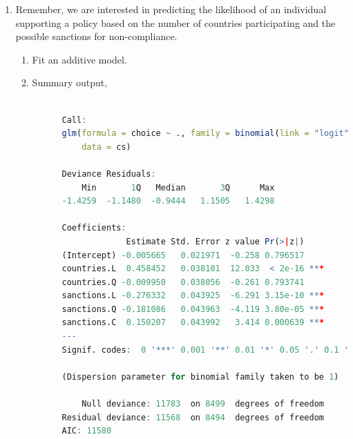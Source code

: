 \documentclass[12pt,letterpaper]{article}
\begin{document}
\begin{enumerate}
	\item
	Remember, we are interested in predicting the likelihood of an individual supporting a policy based on the number of countries participating and the possible sanctions for non-compliance.
	\begin{enumerate}
		\item [] Fit an additive model. 

      
		
		\item Summary output, 

    \begin{lstlisting}[language=R]

      Call:
      glm(formula = choice ~ ., family = binomial(link = "logit"), 
          data = cs)

      Deviance Residuals: 
          Min       1Q   Median       3Q      Max  
      -1.4259  -1.1480  -0.9444   1.1505   1.4298  

      Coefficients:
                   Estimate Std. Error z value Pr(>|z|)    
      (Intercept) -0.005665   0.021971  -0.258 0.796517    
      countries.L  0.458452   0.038101  12.033  < 2e-16 ***
      countries.Q -0.009950   0.038056  -0.261 0.793741    
      sanctions.L -0.276332   0.043925  -6.291 3.15e-10 ***
      sanctions.Q -0.181086   0.043963  -4.119 3.80e-05 ***
      sanctions.C  0.150207   0.043992   3.414 0.000639 ***
      ---
      Signif. codes:  0 '***' 0.001 '**' 0.01 '*' 0.05 '.' 0.1 ' ' 1

      (Dispersion parameter for binomial family taken to be 1)

          Null deviance: 11783  on 8499  degrees of freedom
      Residual deviance: 11568  on 8494  degrees of freedom
      AIC: 11580


\end{lstlisting}
\end{enumerate}
\end{enumerate}
\end{document}
